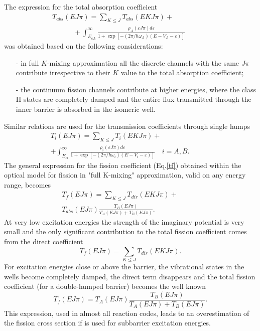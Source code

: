 \documentclass[twocolumn,amsmath,amssymb,10pt,groupedaddress,a4paper]{revtex4}
\begin{document}
The expression for the total absorption coefficient
%
\begin{eqnarray}
T_{abs}(EJ\pi)=\sum_{K\le J}T_{abs}(EKJ\pi) +\qquad\qquad\quad\nonumber\\
\quad\qquad + \int_{E_{cA}}^{\infty} \frac
{\rho_{A}(\varepsilon J\pi)d\varepsilon} {1+\exp\left[  -(2\pi/\hbar\omega_{A})
(E-V_{A}-\varepsilon)\right]  } \label{tabst}%
\end{eqnarray}
%
was obtained based on the following considerations:
\begin{itemize}
\item [-] in full $K$-mixing approximation all the discrete channels with the same
$J\pi$ contribute irrespective to their $K$ value to the total absorption
coefficient;
\item [-] the continuum fission channels contribute at higher energies,
where the class II states are completely damped and the entire flux
transmitted through the inner barrier is absorbed in the isomeric well.
\end{itemize}
Similar relations are used for the transmission coefficients through single humps
%
\begin{eqnarray}
T_{i}(EJ\pi)=\sum_{K\le J}T_{i}(EKJ\pi) +\qquad\qquad\qquad\quad\nonumber\\
+ \int_{E_{ci}}^{\infty} \frac
{\rho_{i}(\varepsilon J\pi)d\varepsilon} {1+\exp\left[  -({2\pi}/\hbar\omega_{i})
(E-V_{i}-\varepsilon)\right]  } \quad i=A,B.
\label{tfi}%
\end{eqnarray}
%
The general expression for the fission coefficient (Eq.\ref{tf}) obtained within the optical
model for fission in "full K-mixing" approximation, valid on any energy range, becomes
%
\begin{eqnarray}
T_{f}(EJ\pi)=\sum_{K\le J}T_{dir}(EKJ\pi)+\qquad\quad\nonumber\\
T_{abs}(E J \pi)\frac{T_{B}(E J \pi)}{T_{A}(E J \pi)+T_{B}(E J \pi)}.
 \label{tfis}%
\end{eqnarray}
%
At very low excitation energies the strength of the
imaginary potential is very small and the only significant contribution to the total fission
coefficient comes from the direct coefficient
%
\begin{equation}
T_{f}(EJ\pi)=\sum_{K\le J}T_{dir}(EKJ\pi).
\label{tf-zero}%
\end{equation}
%
For excitation energies close or above the barrier,
the vibrational states in the wells become completely damped, the direct term disappears and
the total fission coefficient (for a double-humped barrier) becomes the well known
%
\begin{equation}
T_{f}(E J \pi)=T_{A}(E J \pi)\frac{T_{B}(E J \pi)}{T_{A}(E J \pi)+T_{B}(E J \pi)}.
\label{tf-full}
\end{equation}
%
This expression, used in almost all reaction codes, leads to an overestimation of the
fission cross section if is used for subbarrier excitation energies.
\end{document}
